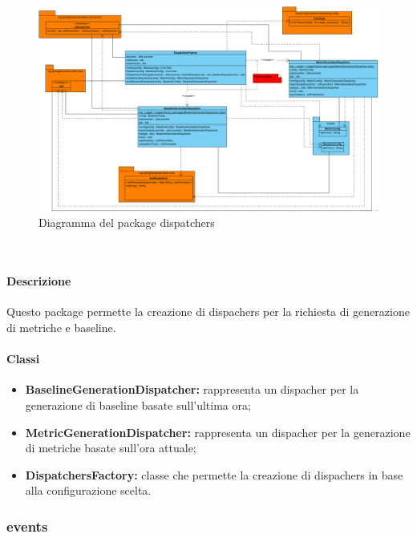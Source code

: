 		\begin{figure}[H]
           	\centering
            \includegraphics[width=\textwidth]{./img/DiagrammiClasse/dispatchers.png}
            \caption[Diagramma del package dispatchers]{Diagramma del package dispatchers}
       	\end{figure}\\
		
		\paragraph*{Descrizione}
			Questo package permette la creazione di dispachers per la richiesta di generazione di metriche e baseline.
		
		\paragraph*{Classi}
		\begin{itemize}
			\item \textbf{BaselineGenerationDispatcher:} rappresenta un dispacher per la generazione di baseline 
				basate sull'ultima ora;
			\item \textbf{MetricGenerationDispatcher:} rappresenta un dispacher per la generazione di metriche 
				basate sull'ora attuale;
			\item \textbf{DispatchersFactory:} classe che permette
				la creazione di dispachers in base alla configurazione scelta.
		\end{itemize}

\newpage

	\subsubsection{events}
		
